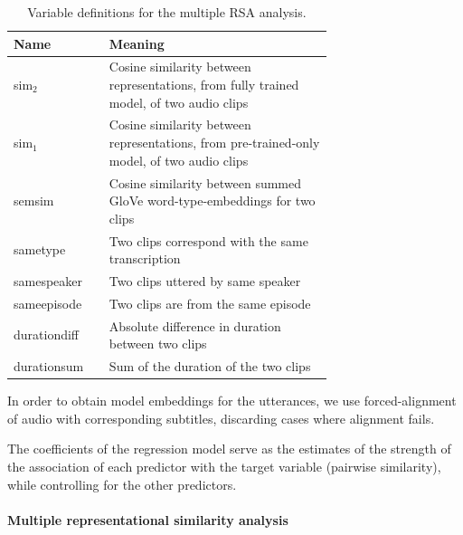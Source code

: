 \begin{table}
  \centering
  \begin{tabular}{lp{0.7\linewidth}}\toprule
    Name              & Meaning \\\midrule
    sim$_2$           & Cosine similarity between representations,
                        from fully trained model,
                        of two audio clips \\
    sim$_1$           & Cosine similarity between representations,
                        from pre-trained-only model,  of two audio
                        clips \\
    semsim            & Cosine similarity between summed GloVe word-type-embeddings for two clips\\
    sametype          & Two clips correspond with the same transcription \\
    samespeaker       & Two clips uttered by same speaker\\
    sameepisode       & Two clips are from the same episode\\
    durationdiff      & Absolute difference in duration between two
                        clips\\
    durationsum       & Sum of the duration of the two clips\\
  \end{tabular}
  \caption{Variable definitions for the multiple RSA analysis.}
  \label{tab:grsa-variables}
\end{table}

 In order to obtain model embeddings
for the utterances, we use forced-alignment of audio with
corresponding subtitles, discarding cases where alignment fails.

The coefficients of the regression model serve as the estimates of the
strength of the association of each predictor with the target variable
(pairwise similarity), while controlling for the other predictors. 



\paragraph{Multiple representational similarity analysis}

